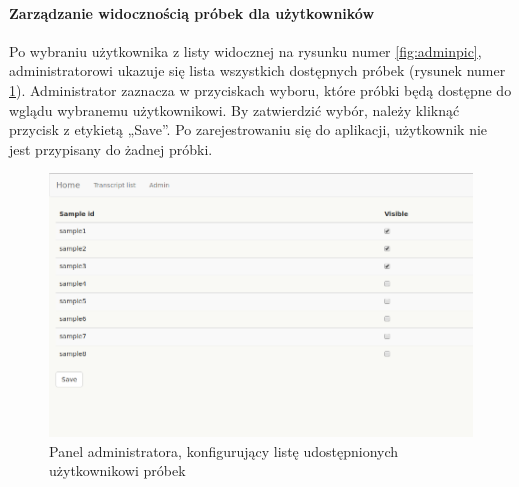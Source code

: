 \documentclass[a4paper,12pt,twoside]{article}
\begin{document}
\newpage
\paragraph{Zarządzanie widocznością próbek dla użytkowników}
Po wybraniu użytkownika z listy widocznej na rysunku numer \ref{fig:adminpic},
administratorowi ukazuje się lista wszystkich dostępnych próbek (rysunek numer \ref{fig:user_priviligespic}). Administrator zaznacza w przyciskach wyboru, które próbki będą dostępne
do wglądu wybranemu użytkownikowi. By zatwierdzić wybór, należy kliknąć
przycisk z etykietą „Save”.
Po zarejestrowaniu się do aplikacji, użytkownik nie jest przypisany do żadnej próbki.

\begin{figure}[h]
\centering
\includegraphics[width=\textwidth]{obrazy/aplikacja/user_priviliges.png}
\caption{Panel administratora, konfigurujący listę udostępnionych użytkownikowi próbek}
\label{fig:user_priviligespic}
\end{figure}

\newpage
{}
\end{document}
